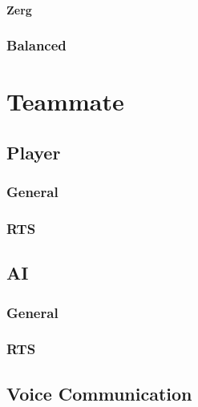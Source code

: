 \paragraph{Zerg}

\subsubsection{Balanced}

\section{Teammate}

\subsection{Player}

\subsubsection{General}

\subsubsection{RTS}

\subsection{AI}

\subsubsection{General}

\subsubsection{RTS}

\subsection{Voice Communication}
